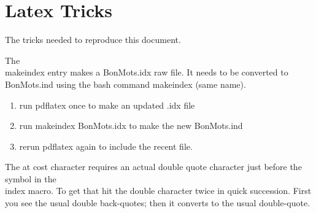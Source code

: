 \section{Latex Tricks}  \label{sec:LatexTricks}

The tricks needed to reproduce this document.

The \\makeindex entry makes a BonMots.idx raw file. It needs to be converted
to BonMots.ind using the bash command makeindex (same name).
\vspace{-.15cm}
\begin{enumerate}\addtolength{\itemsep}{-0.5\baselineskip}
   \item   run pdflatex once to make an updated .idx file
   \item   run makeindex BonMots.idx to make the new BonMots.ind
   \item   rerun pdflatex again to include the recent file.
\end{enumerate}

The at cost character requires an actual double quote character just before
the symbol in the \\index macro. To get that hit the double character twice
in quick succession. First you see the usual double back-quotes; then it
converts to the usual double-quote.


